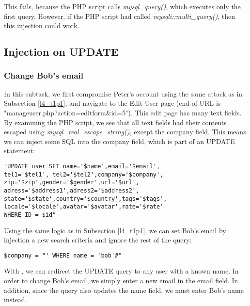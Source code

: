 This fails, because the PHP script calls \emph{mysql\_query()}, which executes only the first query. However, if the PHP script had called \emph{mysqli::multi\_query()}, then this injection could work.

\subsection{Injection on UPDATE} \label{l4_t2}
\subsubsection{Change Bob's email} \label{l4_t2p1}
In this subtask, we first compromise Peter's account using the same attack as in Subsection \ref{l4_t1p1}, and navigate to the Edit User page (end of URL is "manageuser.php?action=editform\&id=5"). This edit page has many text fields. By examining the PHP script, we see that all text fields had their contents escaped using \emph{mysql\_real\_escape\_string()}, except the company field. This means we can inject some SQL into the company field, which is part of an UPDATE statement:

\begin{minipage}{\linewidth}
\begin{lstlisting}[caption={UPDATE statement from the edit form},
label={lst:l4_t2p1_updq},
frame=single]
"UPDATE user SET name='$name',email='$email',
tel1='$tel1', tel2='$tel2',company='$company',
zip='$zip',gender='$gender',url='$url',
adress='$address1',adress2='$address2',
state='$state',country='$country',tags='$tags',
locale='$locale',avatar='$avatar',rate='$rate'
WHERE ID = $id"
\end{lstlisting}
\end{minipage}

Using the same logic as in Subsection \ref{l4_t1p1}, we can set Bob's email by injection a new search criteria and ignore the rest of the query:

\begin{minipage}{\linewidth}
\begin{lstlisting}[caption={UPDATE statement redirection},
label={lst:l4_t2p1_compatk},
frame=single]
$company = "' WHERE name = 'bob'#"
\end{lstlisting}
\end{minipage}

With , we can redirect the UPDATE query to any user with a known name. In order to change Bob's email, we simply enter a new email in the email field. In addition, since the query also updates the name field, we must enter Bob's name instead.

